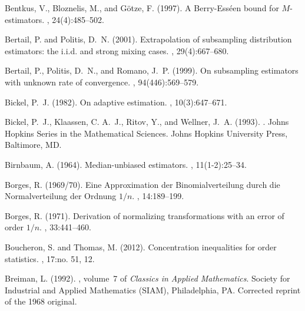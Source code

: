 \documentclass{article}
\numberwithin{myalgctr}{section}
\begin{document}
\begin{thebibliography}{}
Bentkus, V., Bloznelis, M., and G\"{o}tze, F. (1997).
\newblock A {B}erry-{E}ss\'{e}en bound for {$M$}-estimators.
, 24(4):485--502.

Bertail, P. and Politis, D.~N. (2001).
\newblock Extrapolation of subsampling distribution estimators: the i.i.d. and
  strong mixing cases.
, 29(4):667--680.

Bertail, P., Politis, D.~N., and Romano, J.~P. (1999).
\newblock On subsampling estimators with unknown rate of convergence.
, 94(446):569--579.

Bickel, P.~J. (1982).
\newblock On adaptive estimation.
, 10(3):647--671.

Bickel, P.~J., Klaassen, C. A.~J., Ritov, Y., and Wellner, J.~A. (1993).
.
\newblock Johns Hopkins Series in the Mathematical Sciences. Johns Hopkins
  University Press, Baltimore, MD.

Birnbaum, A. (1964).
\newblock Median-unbiased estimators.
, 11(1-2):25--34.

Borges, R. (1969/70).
\newblock Eine {A}pproximation der {B}inomialverteilung durch die
  {N}ormalverteilung der {O}rdnung {$1/n$}.
, 14:189--199.

Borges, R. (1971).
\newblock Derivation of normalizing transformations with an error of order
  {$1/n$}.
, 33:441--460.

Boucheron, S. and Thomas, M. (2012).
\newblock Concentration inequalities for order statistics.
, 17:no. 51, 12.

Breiman, L. (1992).
, volume~7 of {\em Classics in Applied Mathematics}.
\newblock Society for Industrial and Applied Mathematics (SIAM), Philadelphia,
  PA.
\newblock Corrected reprint of the 1968 original.


\end{thebibliography}
\end{document}
